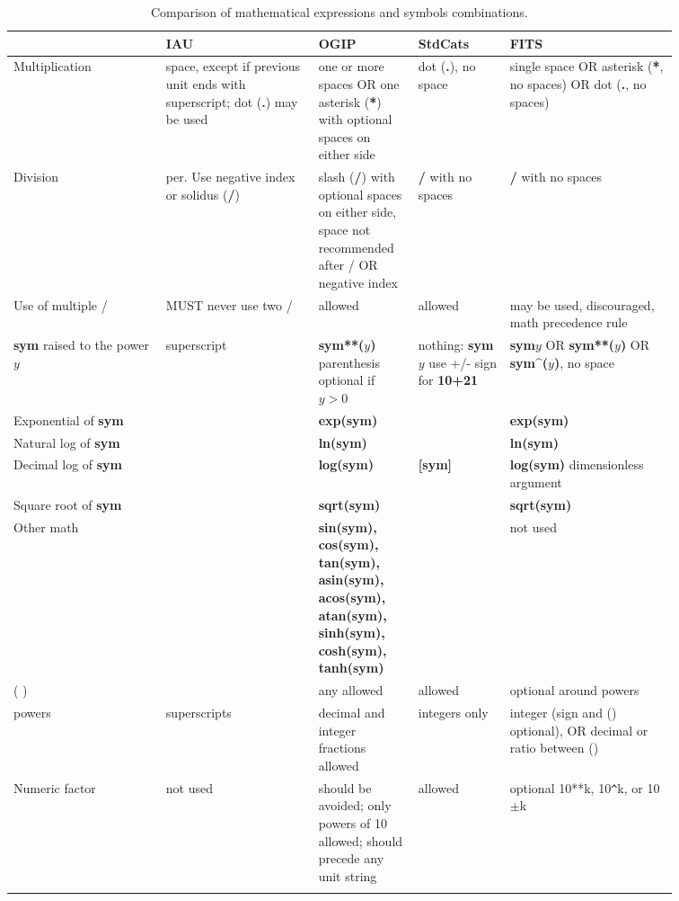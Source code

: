 \documentclass[11pt,notitlepage,onecolumn]{ivoa}
\newcommand{\unit}[1]{\textbf{\textsf{\color{orange}#1}}}
\begin{document}
\begin{longtable}[th]{|p{0.2\linewidth}|p{0.2\linewidth}|p{0.12\linewidth}|p{0.12\linewidth}|p{0.22\linewidth}|}
\hline
    & IAU & OGIP  & StdCats & FITS \\\hline
    Multiplication & space, except if previous unit ends with superscript; dot (\unit{.}) may be used\raggedright
    	& one or more spaces OR one asterisk (\unit{*}) with optional spaces on either side\raggedright 
	& dot (\unit{.}), no space 
	& single space OR asterisk (\unit{*}, no spaces) OR dot (\unit{.}, no spaces) \\\hline
    Division & per. Use negative index or solidus (\unit{/})\raggedright
    	& slash (\unit{/}) with optional spaces on either side, space not recommended after / OR negative index\raggedright
	& \unit{/} with no spaces 
	& \unit{/} with no spaces  \\\hline\hline
    Use of multiple / & MUST never use two /\raggedright 
    	& allowed 
	& allowed 
	& may be used, discouraged, math precedence rule \\\hline\hline
    \unit{sym} raised to the power $y$ & superscript 
    	& \unit{sym**($y$)} parenthesis optional if $y>0$ 
	& nothing: \unit{sym$y$} use +/- sign for \unit{10+21} 
	& \unit{sym$y$} OR \unit{sym**($y$)} OR \unit{sym\^{}($y$)}, no space \\\hline\hline
    Exponential of \unit{sym} &  & \unit{exp(sym)} &  & \unit{exp(sym)} \\\hline\hline
    Natural log of \unit{sym} &  & \unit{ln(sym)} &  & \unit{ln(sym)} \\\hline\hline
    Decimal log of \unit{sym} &  & \unit{log(sym)} & \unit{[sym]} & \unit{log(sym)} dimensionless argument \\\hline\hline
    Square root of \unit{sym} &  & \unit{sqrt(sym)} &  & \unit{sqrt(sym)} \\\hline\hline
    Other math &  & {\small \unit{sin(sym), cos(sym), tan(sym), asin(sym), acos(sym), atan(sym), sinh(sym), cosh(sym), tanh(sym)} } &  & not used \\\hline\hline
    ( ) &  & any allowed & allowed & optional around powers \\\hline\hline
    powers & superscripts & decimal and integer fractions allowed & integers only & integer (sign and () optional), OR decimal or ratio between () \\\hline
    Numeric factor & not used & should be avoided; only powers of 10 allowed; should precede any unit string & allowed & optional 10**k, 10\verb|^|k, or 10$\pm$k \\\hline\hline
  \caption{Comparison of mathematical expressions and symbols combinations.}
  \label{tabx:comparUnitCombine}
\end{longtable}
\end{document}
